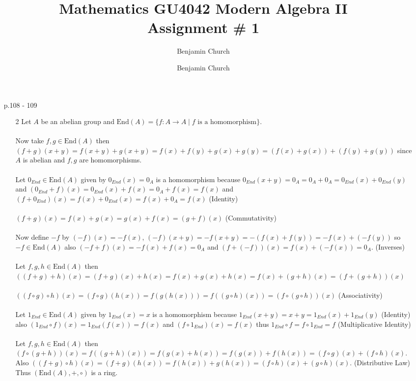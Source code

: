 \documentclass[12pt]{extarticle}
\author{Benjamin Church }
\newcommand{\End}[1]{\text{End}\left( A \right)}
\newcommand{\atitle}[1]{\title{%
	\large \textbf{Mathematics GU4042 Modern Algebra II
	\\ Assignment \# #1} \vspace{-2ex}}
\author{Benjamin Church }
\maketitle}
\begin{document}
\atitle{1}
 
\begin{enumerate}
\item[p.108 - 109]
\begin{enumerate}
\item[2] Let $A$ be an abelian group and $\End{A} = \{ f : A \rightarrow A \mid f \text{ is a homomorphism} \}$. \\ \\
Now take $f,g \in \End{A}$ then $(f+g)(x + y) = f(x+y) + g(x+y) = f(x) + f(y) + g(x) + g(y) = (f(x) + g(x)) + (f(y) + g(y))$ since $A$ is abelian and $f,g$ are homomorphisms. \\ \\
Let $0_{End} \in \End{A}$ given by $0_{End}(x) = 0_A$ is a homomorphism because $0_{End}(x + y) = 0_A = 0_A + 0_A = 0_{End}(x) + 0_{End}(y)$ and $(0_{End} + f)(x) = 0_{End}(x) + f(x) = 0_A + f(x) = f(x)$ and $(f + 0_{End})(x) = f(x) + 0_{End}(x) = f(x) + 0_A = f(x)$ (Identity) \\ \\ 
$(f + g)(x) = f(x) + g(x) = g(x) + f(x) = (g + f)(x)$ (Commutativity) \\ \\
Now define $-f$ by $(-f)(x) = -f(x)$, $(-f)(x + y) = -f(x+y) = -(f(x) + f(y)) = -f(x) + (-f(y))$ so $-f \in \End{A}$ also $(-f + f)(x) = -f(x) + f(x) = 0_A$ and $(f + (-f))(x) = f(x) + (-f(x)) = 0_A$.  (Inverses) \\ \\
Let $f,g,h \in \End{A}$ then $((f + g) + h)(x) = (f + g)(x) + h(x) =  f(x) + g(x) + h(x) = f(x) + (g + h)(x) = (f + (g + h))(x)$ \\ \\
$((f \circ g) \circ h)(x) = (f \circ g)(h(x)) = f(g(h(x))) = f((g \circ h)(x)) = (f \circ (g \circ h))(x)$ (Associativity) \\ \\ 
Let $1_{End} \in \End{A}$ given by $1_{End}(x) = x$ is a homomorphism because $1_{End}(x + y) = x + y = 1_{End}(x) + 1_{End}(y)$ (Identity) also $(1_{End} \circ f)(x) = 1_{End}(f(x)) = f(x)$ and $(f \circ 1_{End})(x) = f(x)$ thus $1_{End} \circ f = f \circ 1_{End} = f$ 
(Multiplicative Identity) \\ \\
Let $f,g,h \in \End{A}$ then $(f \circ (g + h))(x) = f((g + h)(x)) = f(g(x) + h(x)) = f(g(x)) + f(h(x)) = (f \circ g)(x) + (f \circ h)(x)$. Also $((f + g) \circ h)(x) = (f + g)(h(x)) = f(h(x)) + g(h(x)) = (f \circ h)(x) + (g \circ h)(x)$. (Distributive Law) Thus $(\End{A}, + , \circ )$ is a ring.


\end{enumerate}
\end{enumerate}
\end{document}
